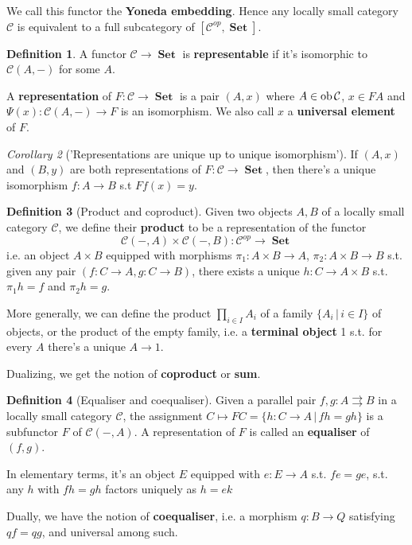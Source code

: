 \documentclass[a4paper]{article}
\theoremstyle{definition}
\newtheorem{definition}{Definition}
\theoremstyle{remark}
\theoremstyle{default}
\newtheorem{corollary}[definition]{Corollary}
\numberwithin{definition}{section}
\newcommand*\ob[1]{\textnormal{ob}\,#1}
\DeclareMathOperator{\Set}{\textbf{Set}}
\begin{document}
We call this functor the \textbf{Yoneda embedding}. Hence any locally small category $\mathcal{C}$ is equivalent to a full subcategory of $[\mathcal{C}^{op}, \Set]$.

\begin{definition}
	A functor $\mathcal{C} \to \Set$ is \textbf{representable} if it's isomorphic to $\mathcal{C}(A, -)$ for some $A$.
	
	A \textbf{representation} of $F: \mathcal{C} \to \Set$ is a pair $(A, x)$ where $A \in \ob \mathcal{C}$, $x \in FA$ and $\Psi(x): \mathcal{C}(A, -) \to F$ is an isomorphism.
	We also call $x$ a \textbf{universal element} of $F$.
\end{definition}

\begin{corollary}['Representations are unique up to unique isomorphism']
	If $(A, x)$ and $(B, y)$ are both representations of $F: \mathcal{C} \to \Set$, then there's a unique isomorphism $f: A \to B$ s.t $Ff(x)=y$.
\end{corollary}

\begin{definition}[Product and coproduct]
	Given two objects $A, B$ of a locally small category $\mathcal{C}$, we define their \textbf{product} to be a representation of the functor
	$$\mathcal{C}(-,A) \times \mathcal{C}(-, B): \mathcal{C}^{op} \to \Set$$
	i.e. an object $A \times B$ equipped with morphisms $\pi_1 : A \times B \to A$, $\pi_2: A \times B \to B$
	s.t. given any pair $(f:C \to A, g: C \to B)$, there exists a unique $h: C \to A \times B$
	s.t. $\pi_1h=f$ and $\pi_2h=g$.
	
	More generally, we can define the product $\prod_{i \in I} A_i$ of a family $\{A_i \,|\, i \in I\}$ of objects,
	or the product of the empty family, i.e. a \textbf{terminal object} 1 s.t. for every $A$ there's a unique $A \to 1$.
	
	Dualizing, we get the notion of \textbf{coproduct} or \textbf{sum}.
\end{definition}

\begin{definition}[Equaliser and coequaliser]
	Given a parallel pair $f, g: A \rightrightarrows B$ in a locally small category $\mathcal{C}$,
	the assignment $C \mapsto FC = \{h: C \to A \,|\, fh=gh\}$ is a subfunctor $F$ of $\mathcal{C}(-, A)$.
	A representation of $F$ is called an \textbf{equaliser} of $(f, g)$.
	
	In elementary terms, it's an object $E$ equipped with $e: E \to A$ s.t. $fe=ge$,
	s.t. any $h$ with $fh = gh$ factors uniquely as $h=ek$
	
	Dually, we have the notion of \textbf{coequaliser},
	i.e. a morphism $q:B \to Q$ satisfying $qf=qg$, and universal among such.
\end{definition}
\end{document}
